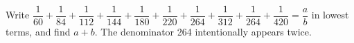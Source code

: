 Write $\dfrac{1}{60}+\dfrac{1}{84}+\dfrac{1}{112}+\dfrac{1}{144}+\dfrac{1}{180}+\dfrac{1}{220}+\dfrac{1}{264}+\dfrac{1}{312}+\dfrac{1}{264}+\dfrac{1}{420}=\dfrac{a}{b}$ in lowest terms, and find $ a+b $. The denominator 264 intentionally appears twice.
